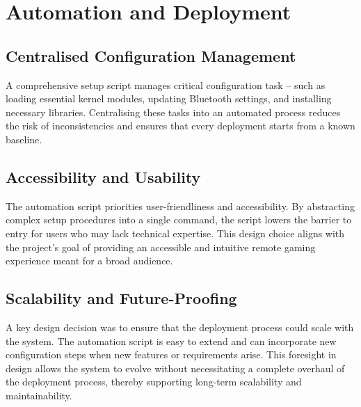 \section{Automation and Deployment}

\subsection{Centralised Configuration Management}
A comprehensive setup script manages critical configuration task -- such as loading essential kernel modules, updating Bluetooth settings, and installing necessary libraries. Centralising these tasks into an automated process reduces the risk of inconsistencies and ensures that every deployment starts from a known baseline.

\subsection{Accessibility and Usability}
The automation script priorities user-friendliness and accessibility. By abstracting complex setup procedures into a single command, the script lowers the barrier to entry for users who may lack technical expertise. This design choice aligns with the project’s goal of providing an accessible and intuitive remote gaming experience meant for a broad audience.

\subsection{Scalability and Future-Proofing}
A key design decision was to ensure that the deployment process could scale with the system. The automation script is easy to extend and can incorporate new configuration steps when new features or requirements arise. This foresight in design allows the system to evolve without necessitating a complete overhaul of the deployment process, thereby supporting long-term scalability and maintainability.




